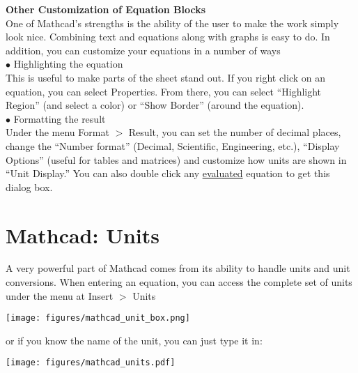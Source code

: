 \noindent \large \textsf{\textbf{Other Customization of Equation Blocks}} \normalsize\\

One of Mathcad's strengths is the ability of the user to make the work simply look nice.  Combining text and equations along with graphs is easy to do.  In addition, you can customize your equations in a number of ways\\

$\bullet$ Highlighting the equation \\

This is useful to make parts of the sheet stand out.  If you right click on an equation, you can select Properties.  From there, you can select ``Highlight Region'' (and select a color) or ``Show Border'' (around the equation).\\

$\bullet$ Formatting the result \\
  
Under the menu Format $>$ Result, you can set the number of decimal places, change the ``Number format'' (Decimal, Scientific, Engineering, etc.), ``Display Options'' (useful for tables and matrices) and customize how units are shown in ``Unit Display.''  You can also double click any \underline{evaluated} equation to get this dialog box.

\section{Mathcad: Units}\label{sec:Mathcad_units}

A very powerful part of Mathcad comes from its ability to handle units and unit conversions.  When entering an equation, you can access the complete set of units under the menu at Insert $>$ Units

\vspace{.35in}
\texttt{[image: figures/mathcad\_unit\_box.png]} %
\vspace{.25in}

\noindent or if you know the name of the unit, you can just type it in:


\begin{center}
\texttt{[image: figures/mathcad\_units.pdf]} %
\end{center}

